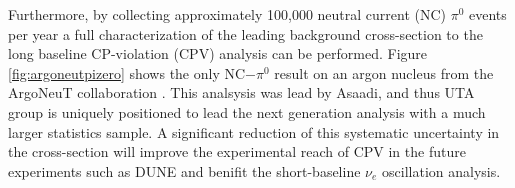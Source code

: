 Furthermore, by collecting approximately 100,000 neutral current (NC) $\pi^{0}$ events per year a full characterization of the leading background cross-section to the long baseline CP-violation (CPV) analysis can be performed. Figure \ref{fig:argoneutpizero} shows the only NC$-\pi^0$ result on an argon nucleus from the ArgoNeuT collaboration \cite{if:ArgoNeuT}. This analsysis was lead by Asaadi, and thus UTA group is uniquely positioned to lead the next generation analysis with a much larger statistics sample. A significant reduction of this systematic uncertainty in the cross-section will improve the experimental reach of CPV in the future experiments such as DUNE and benifit the short-baseline $\nu_{e}$ oscillation analysis.
